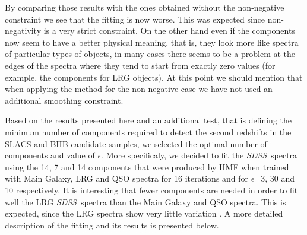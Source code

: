 \documentclass[12pt,preprint]{aastex}
\newcommand{\project}[1]{\textsl{#1}}
\newcommand{\sdss}{\project{SDSS}}
\newcommand{\SDSS}{\sdss}
\begin{document}
By comparing those results with the ones obtained without the
non-negative constraint we see that the fitting is now worse. This was
expected since non-negativity is a very strict constraint. On the
other hand even if the components now seem to have a better physical
meaning, that is, they look more like spectra of particular types of
objects, in many cases there seems to be a problem at the edges of the
spectra where they tend to start from exactly zero values (for
example, the components for LRG objects). At this point we should
mention that when applying the method for the non-negative case we
have not used an additional smoothing constraint.

Based on the results presented here and an additional test, that is 
defining the minimum number of components required to detect the 
second redshifts in the SLACS and BHB candidate samples, we selected 
the optimal number of components and value of $\epsilon$. More specificaly, 
we decided to fit the \SDSS\ spectra using the 14, 7 and 14 components 
that were produced by HMF when trained with Main Galaxy, LRG
and QSO spectra for 16 iterations and for $\epsilon$=3, 30 and 10
respectively. It is interesting that fewer components are needed in
order to fit well the LRG \SDSS\ spectra than the Main
Galaxy and QSO spectra.  This is expected, since the LRG spectra show
very little variation \citep{eishogg}. A more detailed description of
the fitting and its results is presented below.
\end{document}
